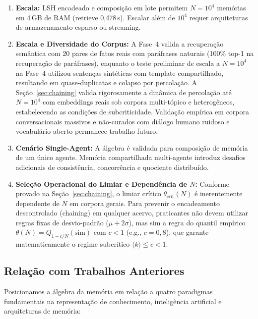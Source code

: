 \documentclass[11pt,a4paper]{article}
\theoremstyle{definition}
\begin{document}
\begin{enumerate}
    \item \textbf{Escala:} LSH encadeado e composi\c{c}\~ao em lote permitem $N = 10^4$ mem\'orias em 4\,GB de RAM (retrieve 0,478\,s). Escalar al\'em de $10^4$ requer arquiteturas de armazenamento esparso ou streaming.
    \item \textbf{Escala e Diversidade do Corpus:} A Fase~4 valida a recupera\c{c}\~ao sem\^antica com 20 pares de fatos reais com par\'afrases naturais (100\% top-1 na recupera\c{c}\~ao de par\'afrases), enquanto o teste preliminar de escala a $N = 10^4$ na Fase~4 utilizou senten\c{c}as sint\'eticas com template compartilhado, resultando em quase-duplicatas e colapso por percola\c{c}\~ao. A Se\c{c}\~ao~\ref{sec:chaining} valida rigorosamente a din\^amica de percola\c{c}\~ao at\'e $N = 10^4$ com embeddings reais sob corpora multi-t\'opico e heterog\^eneos, estabelecendo as condi\c{c}\~oes de subcriticidade. Valida\c{c}\~ao emp\'irica em corpora conversacionais massivos e n\~ao-curados com di\'alogo humano ruidoso e vocabul\'ario aberto permanece trabalho futuro.
    \item \textbf{Cen\'ario Single-Agent:} A \'algebra \'e validada para composi\c{c}\~ao de mem\'oria de um \'unico agente. Mem\'oria compartilhada multi-agente introduz desafios adicionais de consist\^encia, concorr\^encia e quociente distribu\'ido.
    \item \textbf{Sele\c{c}\~ao Operacional do Limiar e Depend\^encia de $N$:} Conforme provado na Se\c{c}\~ao~\ref{sec:chaining}, o limiar cr\'itico $\theta_{\mathrm{crit}}(N)$ \'e inerentemente dependente de $N$ em corpora gerais. Para prevenir o encadeamento descontrolado (chaining) em qualquer acervo, praticantes n\~ao devem utilizar regras fixas de desvio-padr\~ao ($\mu + 2\sigma$), mas sim a regra do quantil emp\'irico $\theta(N) = Q_{1 - c/N}(\mathrm{sim})$ com $c < 1$ (e.g., $c = 0{,}8$), que garante matematicamente o regime subcr\'itico $\langle k \rangle \le c < 1$.
\end{enumerate}

\subsection{Rela\c{c}\~ao com Trabalhos Anteriores}\label{sec:trabalhos_relacionados}

Posicionamos a \'algebra da mem\'oria em rela\c{c}\~ao a quatro paradigmas fundamentais na representa\c{c}\~ao de conhecimento, intelig\^encia artificial e arquiteturas de mem\'oria:
\end{document}
